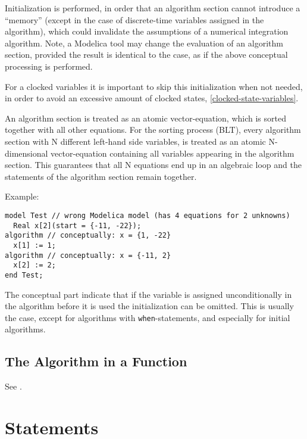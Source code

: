 \begin{nonnormative}
Initialization is performed, in order that an algorithm section cannot introduce a ``memory'' (except in the case of discrete-time variables assigned in the algorithm), which could invalidate the assumptions of a numerical integration algorithm.
Note, a Modelica tool may change the evaluation of an algorithm section, provided the result is identical to the case, as if the above conceptual processing is performed.

For a clocked variables it is important to skip this initialization when not needed, in order to avoid an excessive amount of clocked states, \cref{clocked-state-variables}.

An algorithm section is treated as an atomic vector-equation, which is sorted together with all other equations.
For the sorting process (BLT), every algorithm section with N different left-hand side variables, is treated as an atomic N-dimensional vector-equation containing all variables appearing in the algorithm section.
This guarantees that all N equations end up in an algebraic loop and the statements of the algorithm section remain together.

Example:
\begin{lstlisting}[language=modelica]
model Test // wrong Modelica model (has 4 equations for 2 unknowns)
  Real x[2](start = {-11, -22});
algorithm // conceptually: x = {1, -22}
  x[1] := 1;
algorithm // conceptually: x = {-11, 2}
  x[2] := 2;
end Test;
\end{lstlisting}

The conceptual part indicate that if the variable is assigned unconditionally in the algorithm before it is used the initialization can be omitted.
This is usually the case, except for algorithms with \lstinline!when!-statements, and especially for initial algorithms.
\end{nonnormative}

\subsection{The Algorithm in a Function}\label{execution-of-the-algorithm-in-a-function}\label{the-algorithm-in-a-function}

See .

\section{Statements}\label{statements}

